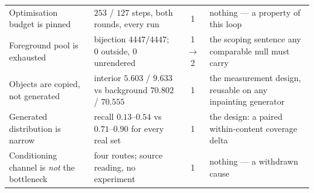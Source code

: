 \documentclass{article} %
\begin{document}
\begin{table}[t]
\begin{center}
\begin{tabular}{p{3.1cm}p{4.0cm}cp{3.6cm}}
\midrule
Optimisation budget is pinned & $253$ / $127$ steps, both rounds, every run & 1 & nothing --- a property of this loop \\
Foreground pool is exhausted & bijection $4447/4447$; $0$ outside, $0$ unrendered & 1 $\rightarrow$ 2 & the scoping sentence any comparable null must carry \\
Objects are copied, not generated & interior $5.603$ / $9.633$ vs background $70.802$ / $70.555$ & 1 & the measurement design, reusable on any inpainting generator \\
Generated distribution is narrow & recall $0.13$--$0.54$ vs $0.71$--$0.90$ for every real set & 1 & the design: a paired within-content coverage delta \\
Conditioning channel is \emph{not} the bottleneck & four routes; source reading, no experiment & 1 & nothing --- a withdrawn cause \\
\bottomrule
\end{tabular}
\end{center}
\end{table}



\end{document}
